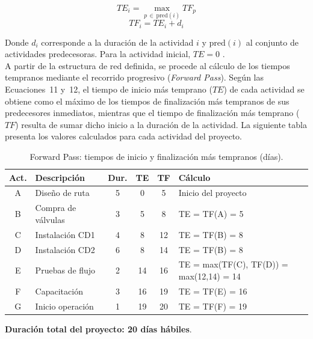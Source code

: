 \documentclass[12pt,a4paper]{article}
\begin{document}
\begin{equation}
  TE_i = \max_{p \,\in\, \text{pred}(i)} TF_p
\end{equation}
\begin{equation}
  TF_i = TE_i + d_i 
\end{equation}

\noindent
Donde $d_i$ corresponde a la duraci\'{o}n de la actividad $i$ y $\text{pred}(i)$ al 
conjunto de actividades predecesoras. Para la actividad inicial, $TE = 0$ \cite{render2012}.\\

A partir de la estructura de red definida, se procede al c\'{a}lculo de los tiempos 
tempranos mediante el recorrido progresivo (\textit{Forward Pass}). Seg\'{u}n las 
Ecuaciones~11 y~12, el tiempo de inicio m\'{a}s temprano ($TE$) de cada actividad se 
obtiene como el m\'{a}ximo de los tiempos de finalizaci\'{o}n m\'{a}s tempranos de sus 
predecesores inmediatos, mientras que el tiempo de finalizaci\'{o}n m\'{a}s temprano 
($TF$) resulta de sumar dicho inicio a la duraci\'{o}n de la actividad. La siguiente 
tabla presenta los valores calculados para cada actividad del proyecto.

\begin{table}[H]
  \centering
  \begin{tabular}{|c|l|c|c|c|l|}
    \hline
    \rowcolor{azulClaro}
    \textbf{Act.} & \textbf{Descripci\'{o}n} & \textbf{Dur.} & \textbf{TE} & \textbf{TF} & \textbf{C\'{a}lculo} \\
    \hline
    A & Dise\~{n}o de ruta     & 5 & 0  & 5  & Inicio del proyecto \\
    B & Compra de v\'{a}lvulas & 3 & 5  & 8  & TE = TF(A) = 5 \\
    C & Instalaci\'{o}n CD1    & 4 & 8  & 12 & TE = TF(B) = 8 \\
    D & Instalaci\'{o}n CD2    & 6 & 8  & 14 & TE = TF(B) = 8 \\
    E & Pruebas de flujo        & 2 & 14 & 16 & TE = max(TF(C), TF(D)) = max(12,14) = 14 \\
    F & Capacitaci\'{o}n       & 3 & 16 & 19 & TE = TF(E) = 16 \\
    G & Inicio operaci\'{o}n   & 1 & 19 & 20 & TE = TF(F) = 19 \\
    \hline
  \end{tabular}
  \caption{Forward Pass: tiempos de inicio y finalizaci\'{o}n m\'{a}s tempranos (d\'{i}as).}
\end{table}

\begin{cajares}
\textbf{Duraci\'{o}n total del proyecto: 20 d\'{i}as h\'{a}biles}.
\end{cajares}
\end{document}
